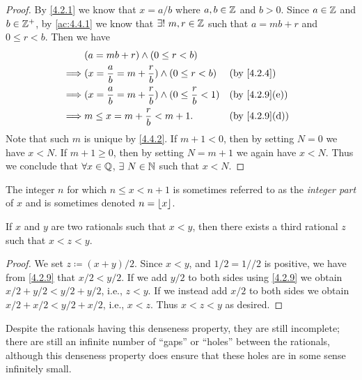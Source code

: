 \begin{proof}
  By \cref{4.2.1} we know that \(x = a / b\) where \(a, b \in \mathbb{Z}\) and \(b > 0\).
  Since \(a \in \mathbb{Z}\) and \(b \in \mathbb{Z}^+\), by \cref{ac:4.4.1} we know that \(\exists!\ m, r \in \mathbb{Z}\) such that \(a = mb + r\) and \(0 \leq r < b\).
  Then we have
  \begin{align*}
             & (a = mb + r) \land (0 \leq r < b)                                                                      \\
    \implies & (x = \dfrac{a}{b} = m + \dfrac{r}{b}) \land (0 \leq r < b)            &  & \text{(by \cref{4.2.4})}    \\
    \implies & (x = \dfrac{a}{b} = m + \dfrac{r}{b}) \land (0 \leq \dfrac{r}{b} < 1) &  & \text{(by \cref{4.2.9}(e))} \\
    \implies & m \leq x = m + \dfrac{r}{b} < m + 1.                                  &  & \text{(by \cref{4.2.9}(d))}
  \end{align*}
  Note that such \(m\) is unique by \cref{4.4.2}.
  If \(m + 1 < 0\), then by setting \(N = 0\) we have \(x < N\).
  If \(m + 1 \geq 0\), then by setting \(N = m + 1\) we again have \(x < N\).
  Thus we conclude that \(\forall x \in \mathbb{Q}\), \(\exists\ N \in \mathbb{N}\) such that \(x < N\).
\end{proof}

\begin{rmk}\label{4.4.2}
  The integer \(n\) for which \(n \leq x < n + 1\) is sometimes referred to as the \emph{integer part} of \(x\) and is sometimes denoted \(n = \left\lfloor x\right\rfloor\).
\end{rmk}

\begin{prop}\label{4.4.3}
  If \(x\) and \(y\) are two rationals such that \(x < y\), then there exists a third rational \(z\) such that \(x < z < y\).
\end{prop}

\begin{proof}
  We set \(z \coloneqq (x + y) / 2\).
  Since \(x < y\), and \(1 / 2 = 1 // 2\) is positive, we have from \cref{4.2.9} that \(x / 2 < y / 2\).
  If we add \(y / 2\) to both sides using \cref{4.2.9} we obtain \(x / 2 + y / 2 < y / 2 + y / 2\), i.e., \(z < y\).
  If we instead add \(x / 2\) to both sides we obtain \(x / 2 + x / 2 < y / 2 + x / 2\), i.e., \(x < z\).
  Thus \(x < z < y\) as desired.
\end{proof}

\begin{note}
  Despite the rationals having this denseness property, they are still incomplete;
  there are still an infinite number of ``gaps'' or ``holes'' between the rationals, although this denseness property does ensure that these holes are in some sense infinitely small.
\end{note}

